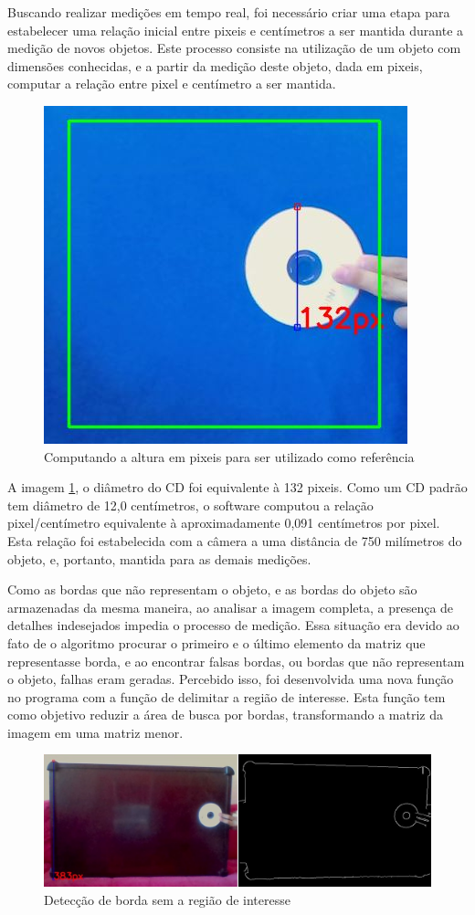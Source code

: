 \documentclass[a4paper,alpha-refs]{RBCA_v1.0}
\begin{document}
Buscando realizar medições em tempo real, foi necessário criar uma etapa para estabelecer uma relação inicial entre pixeis e centímetros a ser mantida durante a medição de novos objetos. Este processo consiste na utilização de um objeto com dimensões conhecidas, e a partir da medição deste objeto, dada em pixeis, computar a relação entre pixel e centímetro a ser mantida.

\begin{figure}[h!]
	\centering
	\includegraphics[width=.3\textwidth]{img/04-IMAGEM2.JPG}
	\caption{Computando a altura em pixeis para ser utilizado como referência}
	\label{img:img2}
\end{figure}

A imagem \ref{img:img2}, o diâmetro do CD foi equivalente à 132 pixeis. Como um CD padrão tem diâmetro de 12,0 centímetros, o software computou a relação pixel/centímetro equivalente à aproximadamente 0,091 centímetros por pixel. Esta relação foi estabelecida com a câmera a uma distância de 750 milímetros do objeto, e, portanto, mantida para as demais medições.

Como as bordas que não representam o objeto, e as bordas do objeto são armazenadas da mesma maneira, ao analisar a imagem completa, a presença de detalhes indesejados impedia o processo de medição. Essa situação era devido ao fato de o algoritmo procurar o primeiro e o último elemento da matriz que representasse borda, e ao encontrar falsas bordas, ou bordas que não representam o objeto, falhas eram geradas. Percebido isso, foi desenvolvida uma nova função no programa com a função de delimitar a região de interesse. Esta função tem como objetivo reduzir a área de busca por bordas, transformando a matriz da imagem em uma matriz menor.

\begin{figure}[h!]
	\centering
	\includegraphics[width=.5\textwidth]{img/05-IMAGEM3.jpg}
	\caption{Detecção de borda sem a região de interesse}
	\label{img:img3}
\end{figure}
\end{document}
